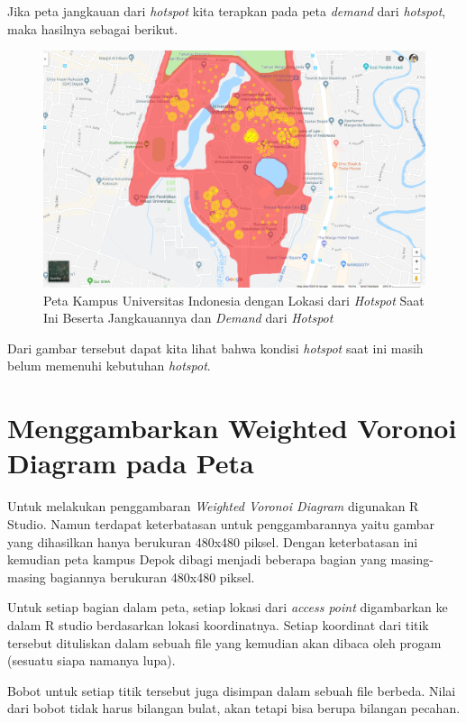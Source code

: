 Jika peta jangkauan dari \textit{hotspot} kita terapkan pada peta \textit{demand} dari \textit{hotspot}, maka hasilnya sebagai berikut.

\begin{figure}
	\centering
	\includegraphics[width=14cm]{pics/ui-demand-coverage.png}
	\caption{Peta Kampus Universitas Indonesia dengan Lokasi dari \textit{Hotspot} Saat Ini Beserta Jangkauannya dan \textit{Demand} dari \textit{Hotspot}}
	\label{fig:uiCoverageDemand}
\end{figure} 

Dari gambar tersebut dapat kita lihat bahwa kondisi \textit{hotspot} saat ini masih belum memenuhi kebutuhan \textit{hotspot}.

\section{Menggambarkan Weighted Voronoi Diagram pada Peta}

Untuk melakukan penggambaran \textit{Weighted Voronoi Diagram} digunakan R Studio. Namun terdapat keterbatasan untuk penggambarannya yaitu gambar yang dihasilkan hanya berukuran 480x480 piksel. Dengan keterbatasan ini kemudian peta kampus {\ui} Depok dibagi menjadi beberapa bagian yang masing-masing bagiannya berukuran 480x480 piksel.

Untuk setiap bagian dalam peta, setiap lokasi dari \textit{access point} digambarkan ke dalam R studio berdasarkan lokasi koordinatnya. Setiap koordinat dari titik tersebut dituliskan dalam sebuah file yang kemudian akan dibaca oleh progam (sesuatu siapa namanya lupa).

Bobot untuk setiap titik tersebut juga disimpan dalam sebuah file berbeda. Nilai dari bobot tidak harus bilangan bulat, akan tetapi bisa berupa bilangan pecahan. 


